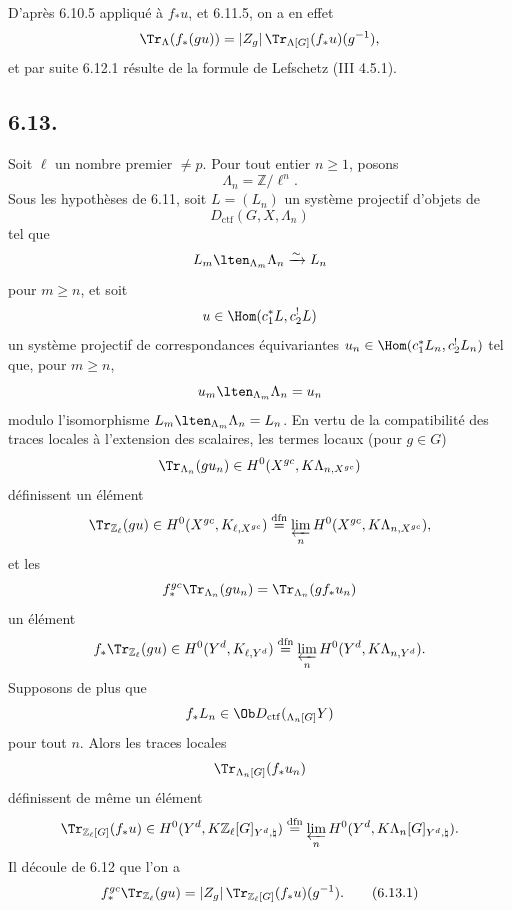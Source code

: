 D'après 6.10.5 appliqué à $f_*u$, et 6.11.5, on a en effet
\[
\Tr_{\Lambda}(f_*(gu))=|Z_g|\,\Tr_{\Lambda[G]}(f_*u)(g^{-1}),
\]
et par suite 6.12.1 résulte de la formule de Lefschetz (III 4.5.1).

\subsection*{6.13.}
Soit $\ell$ un nombre premier $\ne p$. Pour tout entier $n\ge1$, posons
\[
\Lambda_n=\mathbb{Z}/\ell^n.
\]
Sous les hypothèses de 6.11, soit $L=(L_n)$ un système projectif 
d'objets de
\[
D_{\mathrm{ctf}}(G,X,\Lambda_n)
\]
tel que
\[
L_m\lten_{\Lambda_m}\Lambda_n\xrightarrow{\sim}L_n
\]
pour $m\ge n$, et soit
\[
u\in\Hom(c_1^*L,c_2^!L)
\]
un système projectif de correspondances équivariantes $u_n\in\Hom(c_1^*L_n,c_2^!L_n)$ tel que, pour $m\ge n$,
\[
u_m\lten_{\Lambda_m}\Lambda_n=u_n
\]
modulo l'isomorphisme $L_m\lten_{\Lambda_m}\Lambda_n=L_n$. En vertu de la compatibilité des traces locales à l'extension des scalaires, les termes locaux (pour $g\in G$)
\[
\Tr_{\Lambda_n}(gu_n)\in H^0(X^{gc},K\Lambda_{n,X^{gc}})
\]
définissent un élément
\[
\Tr_{\mathbb{Z}_{\ell}}(gu)\in
H^0(X^{gc},K_{\ell,X^{gc}})
\stackrel{\mathrm{dfn}}{=}
\varprojlim_n H^0(X^{gc},K\Lambda_{n,X^{gc}}),
\]
et les
\[
f_*^{gc}\Tr_{\Lambda_n}(gu_n)=\Tr_{\Lambda_n}(gf_*u_n)
\]
un élément
\[
f_*\Tr_{\mathbb{Z}_{\ell}}(gu)\in
H^0(Y^d,K_{\ell,Y^d})
\stackrel{\mathrm{dfn}}{=}
\varprojlim_n H^0(Y^d,K\Lambda_{n,Y^d}).
\]
Supposons de plus que
\[
f_*L_n\in\Ob D_{\mathrm{ctf}}({}_{\Lambda_n[G]}Y)
\]
pour tout $n$. Alors les traces locales
\[
\Tr_{\Lambda_n[G]}(f_*u_n)
\]
définissent de même un élément
\[
\Tr_{\mathbb{Z}_{\ell}[G]}(f_*u)\in
H^0(Y^d,K\mathbb{Z}_{\ell}[G]_{Y^d,\natural})
\stackrel{\mathrm{dfn}}{=}
\varprojlim_n H^0(Y^d,K\Lambda_n[G]_{Y^d,\natural}).
\]
Il découle de 6.12 que l'on a
\begin{equation}
f_*^{gc}\Tr_{\mathbb{Z}_{\ell}}(gu)
=
|Z_g|\,\Tr_{\mathbb{Z}_{\ell}[G]}(f_*u)(g^{-1}).
\tag{6.13.1}
\end{equation}

